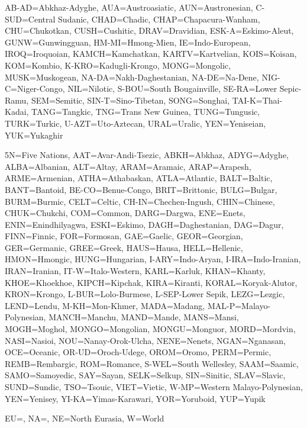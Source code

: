 {}
{} 

\begin{flushleft}
AB-AD=Abkhaz-Adyghe, AUA=Austroasiatic, AUN=Austronesian, C-SUD=Central Sudanic, CHAD=Chadic, CHAP=Chapacura-Wanham, CHU=Chukotkan, CUSH=Cushitic, DRAV=Dravidian, ESK-A=Eskimo-Aleut, GUNW=Gunwingguan, HM-MI=Hmong-Mien, IE=Indo-European, IROQ=Iroquoian, KAMCH=Kamchatkan, KARTV=Kartvelian, KOIS=Koisan, KOM=Kombio, K-KRO=Kadugli-Krongo, MONG=Mongolic, MUSK=Muskogean, NA-DA=Nakh-Daghestanian, NA-DE=Na-Dene, NIG-C=Niger-Congo, NIL=Nilotic, S-BOU=South Bougainville, SE-RA=Lower Sepic-Ramu, SEM=Semitic, SIN-T=Sino-Tibetan, SONG=Songhai, TAI-K=Thai-Kadai, TANG=Tangkic, TNG=Trans New Guinea, TUNG=Tungusic, TURK=Turkic, U-AZT=Uto-Aztecan, URAL=Uralic, YEN=Yeniseian, YUK=Yukaghir
\end{flushleft}

\begin{flushleft}
5N=Five Nations, AAT=Avar-Andi-Tsezic, ABKH=Abkhaz, ADYG=Adyghe, ALBA=Albanian, ALT=Altay, ARAM=Aramaic, ARAP=Arapesh, ARME=Armenian, ATHA=Athabaskan, ATLA=Atlantic, BALT=Baltic, BANT=Bantoid, BE-CO=Benue-Congo, BRIT=Brittonic, BULG=Bulgar, BURM=Burmic, CELT=Celtic, CH-IN=Chechen-Ingush, CHIN=Chinese, CHUK=Chukchi, COM=Common, DARG=Dargwa, ENE=Enets, ENIN=Enindhilyagwa, ESKI=Eskimo, DAGH=Daghestanian, DAG=Dagur, FINN=Finnic, FOR=Formosan, GAE=Gaelic, GEOR=Georgian, GER=Germanic, GREE=Greek, HAUS=Hausa, HELL=Hellenic, HMON=Hmongic, HUNG=Hungarian, I-ARY=Indo-Aryan, I-IRA=Indo-Iranian, IRAN=Iranian, IT-W=Italo-Western, KARL=Karluk, KHAN=Khanty, KHOE=Khoekhoe, KIPCH=Kipchak, KIRA=Kiranti, KORAL=Koryak-Alutor, KRON=Krongo, L-BUR=Lolo-Burmese, L-SEP-Lower Sepik, LEZG=Lezgic, LEND=Lendu, M-KH=Mon-Khmer, MADA=Madang, MAL-P=Malayo-Polynesian, MANCH=Manchu, MAND=Mande, MANS=Mansi, MOGH=Moghol, MONGO=Mongolian, MONGU=Monguor, MORD=Mordvin, NASI=Nasioi, NOU=Nanay-Orok-Ulcha, NENE=Nenets, NGAN=Nganasan, OCE=Oceanic, OR-UD=Oroch-Udege, OROM=Oromo, PERM=Permic,  REMB=Rembargic, ROM=Romance, S-WEL=South Wellesley, SAAM=Saamic, SAMO=Samoyedic, SAY=Sayan, SELK=Selkup, SIN=Sinitic, SLAV=Slavic, SUND=Sundic, TSO=Tsouic, VIET=Vietic, W-MP=Western Malayo-Polynesian, YEN=Yenisey, YI-KA=Yimas-Karawari, YOR=Yoruboid, YUP=Yupik
\end{flushleft}

\begin{flushleft}
EU=, NA=, NE=North Eurasia, W=World
\end{flushleft}

